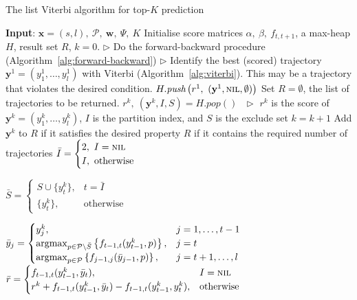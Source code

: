 \begin{algorithm}[htbp]
\caption{The list Viterbi algorithm for top-$K$ prediction~\cite{nilsson2001sequentially,seshadri1994list}}
\label{alg:listviterbi}
\begin{algorithmic}[1]
\STATE \textbf{Input}: $\mathbf{x}=(s, l),~ \mathcal{P},~ \mathbf{w},~ \Psi, ~K$
\STATE Initialise score matrices $\alpha,~ \beta,~ f_{t, t+1}$, a max-heap $H$, result set $R$, $k=0$.
\STATE $\triangleright$ Do the forward-backward procedure (Algorithm~\ref{alg:forward-backward})
\STATE $\triangleright$ Identify the best (scored) trajectory $\mathbf{y}^1=(y_1^1,\dots,y_l^1)$
  with Viterbi (Algorithm~\ref{alg:viterbi}). This may be a trajectory that violates the desired condition.
\STATE $H.\textit{push}\left(r^1,~ (\mathbf{y}^1, \textsc{nil}, \emptyset) \right)$
\STATE Set $R=\emptyset$, the list of trajectories to be returned.
    \STATE $r^k,~ (\mathbf{y}^k, I, S) = H.\textit{pop}()~~~ \triangleright$
           $r^k$ is the score of $\mathbf{y}^k=(y_1^k,\dots,y_l^k)$, $I$ is the partition index, and $S$ is the exclude set
    \STATE $k = k + 1$
    \STATE Add $\mathbf{y}^k$ to $R$ if it satisfies the desired property
    \RETURN $R$ if it contains the required number of trajectories
    \STATE $\bar{I} = \begin{cases}
                      2,~ I = \textsc{nil} \\
                      I,~ \text{otherwise}
                      \end{cases}$

        \STATE $\bar{S} = \begin{cases}
                          S \cup \{ y_t^k \},& t = \bar{I} \\
                          \{ y_t^k \},& \text{otherwise}
                          \end{cases}$

        \STATE $\bar{y}_j = \begin{cases}
                            y_j^k,& j=1,\dots,t-1 \\
                            \operatorname*{argmax}_{p \in \mathcal{P} \setminus \bar{S}} \left\{ f_{t-1,t}(y_{t-1}^k, p) \right\},& j=t \\
                            \operatorname*{argmax}_{p \in \mathcal{P}} \left\{ f_{j-1, j}(\bar{y}_{j-1}, p) \right\},& j=t+1,\dots,l
                \end{cases}$
        \STATE $\bar{r} = \begin{cases}
                          f_{t-1,t}(y_{t-1}^k, \bar{y}_t),&I = \textsc{nil} \\
                          r^k + f_{t-1,t}(y_{t-1}^k, \bar{y}_t) - f_{t-1,t}(y_{t-1}^k, y_t^k), &\text{otherwise}
                          \end{cases}$


\end{algorithmic}
\end{algorithm}
